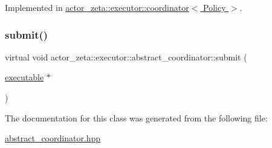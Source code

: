Implemented in \hyperlink{classactor__zeta_1_1executor_1_1coordinator_a1b73b7ddd6b48ba3e15b6f710cb21808}{actor\+\_\+zeta\+::executor\+::coordinator$<$ Policy $>$}.

\mbox{\label{classactor__zeta_1_1executor_1_1abstract__coordinator_a4e9c6ebc0d950993e051a6f512539dfa}} 
\subsubsection{\texorpdfstring{submit()}{submit()}}
{\footnotesize\ttfamily virtual void actor\+\_\+zeta\+::executor\+::abstract\+\_\+coordinator\+::submit (\begin{DoxyParamCaption}\item[{\hyperlink{structactor__zeta_1_1executor_1_1executable}{executable} $\ast$}]{ }\end{DoxyParamCaption})\hspace{0.3cm}{\ttfamily [pure virtual]}}



The documentation for this class was generated from the following file\+:\begin{DoxyCompactItemize}
\item 
\hyperlink{abstract__coordinator_8hpp}{abstract\+\_\+coordinator.\+hpp}\end{DoxyCompactItemize}
